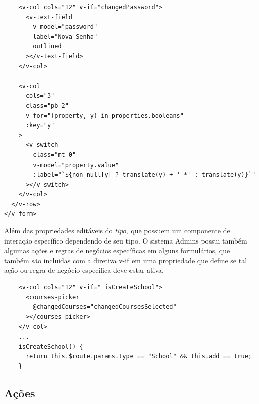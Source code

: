 \begin{lstlisting}
    <v-col cols="12" v-if="changedPassword">
      <v-text-field
        v-model="password"
        label="Nova Senha"
        outlined
      ></v-text-field>
    </v-col>
    
    <v-col
      cols="3"
      class="pb-2"
      v-for="(property, y) in properties.booleans"
      :key="y"
    >
      <v-switch
        class="mt-0"
        v-model="property.value"
        :label="`${non_null[y] ? translate(y) + ' *' : translate(y)}`"
      ></v-switch>
    </v-col>
  </v-row>
</v-form>
\end{lstlisting}

Além das propriedades editáveis do \textit{tipo}, que possuem um componente de interação específico dependendo de seu tipo. O sistema Admins possui também algumas ações e regras de negócios específicas em alguns formulários, que também são incluidas com a diretiva v-if em uma propriedade que define se tal ação ou regra de negócio específica deve estar ativa.

\begin{lstlisting}
    <v-col cols="12" v-if=" isCreateSchool">
      <courses-picker
        @changedCourses="changedCoursesSelected"
      ></courses-picker>
    </v-col>
    ...
    isCreateSchool() {
      return this.$route.params.type == "School" && this.add == true;
    }
\end{lstlisting}


\subsection{Ações}

